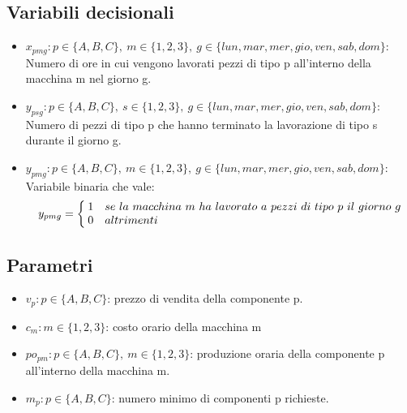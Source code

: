 \documentclass[12pt]{article}
\makeatletter
\newenvironment{sistema}%
{\left\lbrace\begin{array}{@{}l@{}}}%
	{\end{array}\right.}
\makeatother
\begin{document}
	\subsection{Variabili decisionali}
	\begin{itemize}
		\item \( x_{pmg} : p \in \{A, B, C\},\ m \in \{1, 2, 3\},\ g \in \{lun, mar, mer, gio, ven, sab, dom\}\): Numero di ore in cui vengono lavorati pezzi di tipo p all'interno della macchina m nel giorno g.
		\item \( y_{psg} : p \in \{A, B, C\},\ s \in \{1, 2, 3\},\ g \in \{lun, mar, mer, gio, ven, sab, dom\}\): Numero di pezzi di tipo p che hanno terminato la lavorazione di tipo s durante il giorno g.
		\item \( y_{pmg} : p \in \{A, B, C\},\ m \in \{1, 2, 3\},\ g \in \{lun, mar, mer, gio, ven, sab, dom\}\): Variabile binaria che vale:
		\[ 
			y_{pmg}=
			\begin{sistema} 
				\: 1 \quad se\ la\ macchina\ m\ ha\ lavorato\ a\ pezzi\ di\ tipo\ p\ il\ giorno\ g\\
				\: 0 \quad altrimenti \\ 
			\end{sistema} 
		\]
	\end{itemize}
	\subsection{Parametri}
	\begin{itemize}
		\item \( v_p : p \in \{A, B, C\} \): prezzo di vendita della componente p.
		\item \( c_m : m \in \{1, 2, 3\} \): costo orario della macchina m
		\item \( po_{pm} : p \in \{A, B, C\},\ m \in \{1, 2, 3\}\): produzione oraria della componente p all'interno della macchina m.
		\item \( m_p : p \in \{A, B, C\}\): numero minimo di componenti p richieste.
	\end{itemize}
\end{document}

